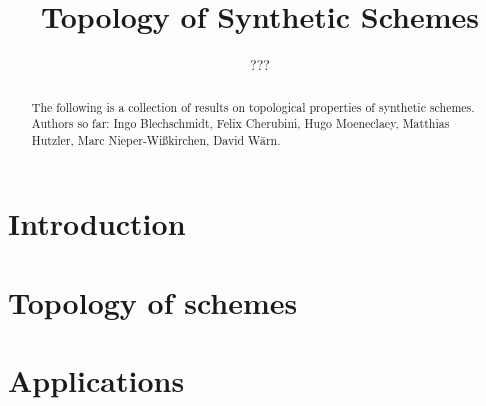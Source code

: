 \documentclass{../util/zariski}
\title{Topology of Synthetic Schemes}
\author{???}
\begin{document}
\maketitle

\begin{abstract}
  The following is a collection of results on topological properties of synthetic schemes.
  Authors so far: Ingo Blechschmidt, Felix Cherubini, Hugo Moeneclaey, Matthias Hutzler, Marc Nieper-Wißkirchen, David Wärn.
\end{abstract}

\tableofcontents

\section*{Introduction}


\section{Topology of schemes}


\section{Applications}


\printindex

\printbibliography
\end{document}
